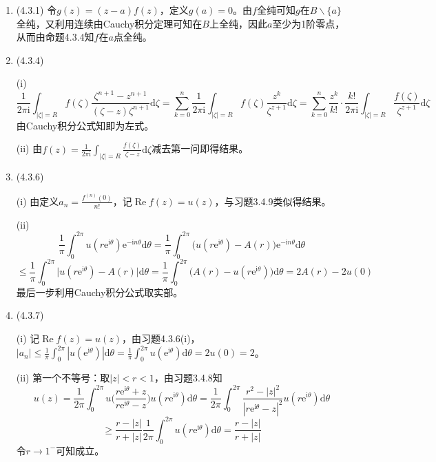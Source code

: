 \documentclass[a4paper,UTF8,fontset=windows]{ctexart}
\DeclareMathOperator{\re}{Re}
\begin{document}
\begin{enumerate}
    \item (4.3.1)
    令$g(z)=(z-a)f(z)$，定义$g(a)=0$。由$f$全纯可知$g$在$B\backslash\{a\}$全纯，又利用连续由Cauchy积分定理可知在$B$上全纯，因此$a$至少为1阶零点，从而由命题4.3.4知$f$在$a$点全纯。
    
    \item (4.3.4)
    
    (i)
    \[\frac{1}{2\pi\mathrm{i}}\int_{|\zeta|=R}f(\zeta)\frac{\zeta^{n+1}-z^{n+1}}{(\zeta-z)\zeta^{n+1}}\mathrm{d}\zeta=\sum_{k=0}^n\frac{1}{2\pi\mathrm{i}}\int_{|\zeta|=R}f(\zeta)\frac{z^k}{\zeta^{z+1}}\mathrm{d}\zeta=\sum_{k=0}^n\frac{z^k}{k!}\cdot\frac{k!}{2\pi\mathrm{i}}\int_{|\zeta|=R}\frac{f(\zeta)}{\zeta^{z+1}}\mathrm{d}\zeta\]
    由Cauchy积分公式知即为左式。
    
    (ii) 由$f(z)=\frac{1}{2\pi\mathrm{i}}\int_{|\zeta|=R}\frac{f(\zeta)}{\zeta-z}\mathrm{d}\zeta$减去第一问即得结果。
    
    \item (4.3.6)
    
    (i) 由定义$a_n=\frac{f^{(n)}(0)}{n!}$，记$\re f(z)=u(z)$，与习题3.4.9类似得结果。
    
    (ii)
    \[\frac{1}{\pi}\int_0^{2\pi}u(r\mathrm{e}^{\mathrm{i}\theta})\mathrm{e}^{-\mathrm{i}n\theta}\mathrm{d}\theta=\frac{1}{\pi}\int_0^{2\pi}\big(u(r\mathrm{e}^{\mathrm{i}\theta})-A(r)\big)\mathrm{e}^{-\mathrm{i}n\theta}\mathrm{d}\theta\]
    \[\le\frac{1}{\pi}\int_0^{2\pi}\big|u(r\mathrm{e}^{\mathrm{i}\theta})-A(r)\big|\mathrm{d}\theta=\frac{1}{\pi}\int_0^{2\pi}\big(A(r)-u(r\mathrm{e}^{\mathrm{i}\theta})\big)\mathrm{d}\theta=2A(r)-2u(0)\]
    最后一步利用Cauchy积分公式取实部。
    
    \item (4.3.7)
    
    (i) 记$\re f(z)=u(z)$，由习题4.3.6(i)，$|a_n|\le\frac{1}{\pi}\int_0^{2\pi}|u(\mathrm{e}^{\mathrm{i}\theta})|\mathrm{d}\theta=\frac{1}{\pi}\int_0^{2\pi}u(\mathrm{e}^{\mathrm{i}\theta})\mathrm{d}\theta=2u(0)=2$。
    
    (ii) 第一个不等号：取$|z|<r<1$，由习题3.4.8知
    \[u(z)=\frac{1}{2\pi}\int_{0}^{2\pi}u\bigg(\frac{r\mathrm{e}^{\mathrm{i}\theta}+z}{r\mathrm{e}^{\mathrm{i}\theta}-z}\bigg)u(r\mathrm{e}^{\mathrm{i}\theta})\mathrm{d}\theta=\frac{1}{2\pi}\int_{0}^{2\pi}\frac{r^2-|z|^2}{|r\mathrm{e}^{\mathrm{i}\theta}-z|^2}u(r\mathrm{e}^{\mathrm{i}\theta})\mathrm{d}\theta\]\[\ge\frac{r-|z|}{r+|z|}\frac{1}{2\pi}\int_{0}^{2\pi}u(r\mathrm{e}^{\mathrm{i}\theta})\mathrm{d}\theta=\frac{r-|z|}{r+|z|}\]
    令$r\to1^-$可知成立。
    

\end{enumerate}
\end{document}
